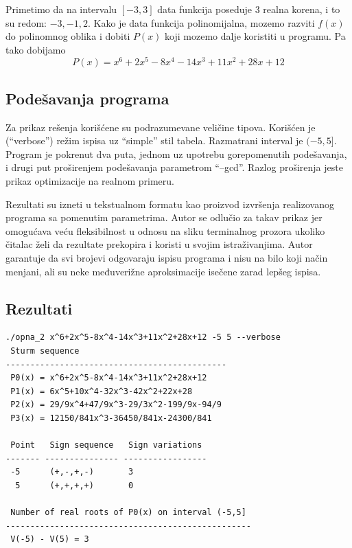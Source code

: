 \documentclass[a4paper,10pt]{article}
\begin{document}
Primetimo da na intervalu $[-3,3]$ data funkcija poseduje 3 realna korena, i to su redom: $-3, -1, 2$. Kako je data funkcija polinomijalna, mozemo razviti $f(x)$ do polinomnog oblika i dobiti $P(x)$ koji mozemo dalje koristiti u programu. Pa tako dobijamo
\begin{equation}
    P(x) = x^6 + 2x^5 - 8x^4 - 14x^3 + 11x^2 + 28x + 12
\end{equation}

\subsection{Podešavanja programa}
Za prikaz rešenja korišćene su podrazumevane veličine tipova. Korišćen je (``verbose'') režim ispisa uz ``simple'' stil tabela. Razmatrani interval je $(-5,5]$. 
Program je pokrenut dva puta, jednom uz upotrebu gorepomenutih podešavanja, i drugi put proširenjem podešavanja parametrom ``--gcd''. Razlog proširenja jeste prikaz optimizacije na realnom primeru.
\vspace{11pt}

Rezultati su izneti u tekstualnom formatu kao proizvod izvršenja realizovanog programa sa pomenutim parametrima. Autor se odlučio za takav prikaz jer omogućava veću fleksibilnost u odnosu na sliku terminalnog prozora ukoliko čitalac želi da rezultate prekopira i koristi u svojim istraživanjima. Autor garantuje da svi brojevi odgovaraju ispisu programa i nisu na bilo koji način menjani, ali su neke međuverižne aproksimacije isečene zarad lepšeg ispisa.

\subsection{Rezultati}
\begin{verbatim}
./opna_2 x^6+2x^5-8x^4-14x^3+11x^2+28x+12 -5 5 --verbose
 Sturm sequence                              
---------------------------------------------
 P0(x) = x^6+2x^5-8x^4-14x^3+11x^2+28x+12    
 P1(x) = 6x^5+10x^4-32x^3-42x^2+22x+28       
 P2(x) = 29/9x^4+47/9x^3-29/3x^2-199/9x-94/9 
 P3(x) = 12150/841x^3-36450/841x-24300/841   

 Point   Sign sequence   Sign variations 
------- --------------- -----------------
 -5      (+,-,+,-)       3               
  5      (+,+,+,+)       0               

 Number of real roots of P0(x) on interval (-5,5] 
--------------------------------------------------
 V(-5) - V(5) = 3                                 
\end{verbatim}
\end{document}
